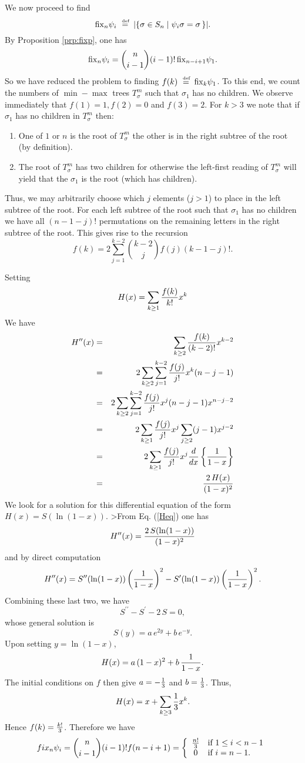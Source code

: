 We now proceed to find 
$${\rm fix}_n\psi_i \stackrel{\mbox{\rm\tiny\, def }}{=} |\{\sigma \in S_n \mid \psi_i \sigma = \sigma \,\}|.$$
By Proposition \ref{prp:fixp}, one has
$$
{\rm fix}_n\psi_i = {{n} \choose{i-1}}(i-1)! \, {\rm fix}_{n-i+1}\psi_1.
$$
So we have reduced the problem to finding  $f(k) \stackrel{\mbox{\rm\tiny\, def }}{=} {\rm fix}_k\psi_1$.
To this end, we count the numbers of $\min-\max$ 
trees $T_\sigma^m$ such that $\sigma_1$ has no children.
We observe immediately that $f(1) = 1, f(2) = 0$ and $f(3) = 2$.
For $k >3$ we note that if $\sigma_1$ has no children in $T_{\sigma}^m$ then:
\begin{enumerate}
\item
One of $1$ or $n$ is the root of $T_\sigma^m$  the
other is in the right subtree of the root (by definition).
\item The root of $T^m_\sigma$ has two children for otherwise
the left-first reading of $T_\sigma^m$ will yield that the $\sigma_1$ is
the root (which has children).
\end{enumerate}
Thus, we may arbitrarily choose which $j$ elements  ($j >1$)
to place in the left subtree of the root. For each left subtree of the 
root such that $\sigma_1$ has no children we have  
all $(n-1-j)!$ permutations on the remaining letters in the right 
subtree of the root.  
This gives rise to the  recursion
$$
f(k) = 2 
\sum_{j=1}^{k-2} {k-2 \choose j}f(j)(k-1-j)! .
$$

Setting $$H(x) = \sum_{k\ge 1}{f(k) \over k!} x^k$$
We have
\begin{eqnarray}
H^{\prime\prime}(x) & = &  \sum_{k\ge 2}{f(k) \over (k-2)!} x^{k-2} \\  
& = & 2\sum_{k\ge 2}\sum_{j = 1}^{k-2}{f(j) \over j!} x^k(n-j-1)\\ 
& = & 2\sum_{k\ge 2}\sum_{j = 1}^{k-2}{f(j) \over j!} x^j(n-j-1)x^{n-j-2}\\
& = & 2\sum_{k\ge 1}{f(j) \over j!} x^j\sum_{j \ge 2}(j-1)x^{j-2}\\
& = & 2\sum_{k\ge 1}{f(j) \over j!} x^j {d \over dx}
                    \left\{ {1 \over 1-x} \right\}\\
& = & {2\,H(x) \over{(1-x)^2}} \label{Heq}
\end{eqnarray}
We look for a solution for this differential equation of the form 
$H(x) = S(\ln(1-x))$.
>From Eq. (\ref{Heq}) one has 
$$
H^{\prime\prime}(x) = {2\,S(\ln(1-x)) \over (1-x)^2}
$$
and by direct computation
$$
H^{\prime\prime}(x)  =  S^{\prime\prime}(\ln(1-x))\left({1 \over 1-x}\right)^2
-S^\prime(\ln(1-x))\left({1 \over 1-x}\right)^2.
$$
Combining these last two, we have
$$S^{\prime\prime}-S^\prime-2\,S =0,$$
whose general solution is 
$$
S(y) = a\,e^{2y} +b\,e^{-y}.
$$
Upon setting $y = \ln(1-x)$,
$$ H(x) = a\,(1-x)^2+ b\,{1 \over 1-x}. $$ 
The initial conditions on $f$ then give $a=-{1 \over 3}$ and $b = {1 \over 3}$.
Thus, 
$$H(x) = x+ \sum_{k \ge 3}{1 \over 3}x^k.$$
Hence $f(k) = {k! \over 3}$.
Therefore we have
$$
fix_n\psi_i = {n \choose i-1}(i-1)! f(n-i+1) = 
\left\{
\begin{array}{cl}
{n! \over 3} & \mbox{if } 1\le i < n-1    \\
0 & \mbox{if } i = n-1. 
\end{array}\right.
$$

